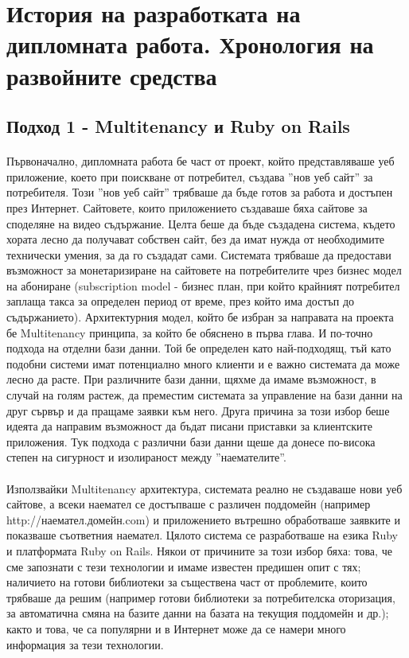 \documentclass[pdftex,14pt,a4paper]{extreport}
\begin{document}
\section {История на разработката на дипломната работа. Хронология на развойните средства}
\subsection {Подход 1 - Multitenancy и Ruby on Rails}
\paragraph {}
Първоначално, дипломната работа бе част от проект, който представляваше уеб приложение, което при поискване от потребител, създава ''нов уеб сайт'' за потребителя. Този ''нов уеб сайт'' трябваше да бъде готов за работа и достъпен през Интернет. Сайтовете, които приложението създаваше бяха сайтове за споделяне на видео съдържание. Целта беше да бъде създадена система, където хората лесно да получават собствен сайт, без да имат нужда от необходимите технически умения, за да го създадат сами. Системата трябваше да предостави възможност за монетаризиране на сайтовете на потребителите чрез бизнес модел на абониране (subscription model - бизнес план, при който крайният потребител заплаща такса за определен период от време, през който има достъп до съдържанието). Архитектурния модел, който бе избран за направата на проекта бе Multitenancy принципа, за който бе обяснено в първа глава. И по-точно подхода на отделни бази данни. Той бе определен като най-подходящ, тъй като подобни системи имат потенциално много клиенти и е важно системата да може лесно да расте. При различните бази данни, щяхме да имаме възможност, в случай на голям растеж, да преместим системата за управление на бази данни на друг сървър и да пращаме заявки към него. Друга причина за този избор беше идеята да направим възможност да бъдат писани приставки за клиентските приложения. Тук подхода с различни бази данни щеше да донесе по-висока степен на сигурност и изолираност между ''наемателите''. 
\paragraph {}

Използвайки Multitenancy архитектура, системата реално не създаваше нови уеб сайтове, а всеки наемател се достъпваше с различен поддомейн (например http://наемател.домейн.com) и приложението вътрешно обработваше заявките и показваше съответния наемател. Цялото система се разработваше на езика Ruby и платформата Ruby on Rails. Някои от причините за този избор бяха: това, че сме запознати с тези технологии и имаме известен предишен опит с тях; наличието на готови библиотеки за съществена част от проблемите, които трябваше да решим (например готови библиотеки за потребителска оторизация, за автоматична смяна на базите данни на базата на текущия поддомейн и др.); както и това, че са популярни и в Интернет може да се намери много информация за тези технологии.
\end{document}
